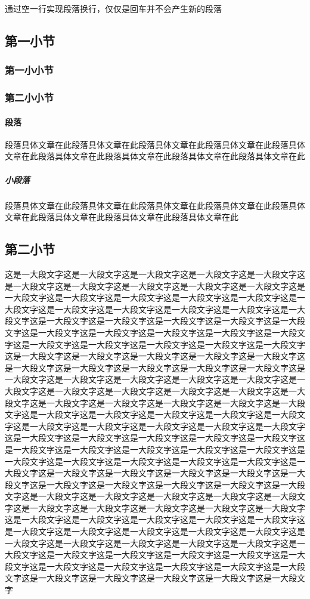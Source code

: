 \documentclass{HustGraduPaper}
\begin{document}
	通过空一行实现段落换行，仅仅是回车并不会产生新的段落
	\subsection{第一小节}
	\subsubsection{第一小小节}
	\subsubsection{第二小小节}
	\paragraph{段落}段落具体文章在此段落具体文章在此段落具体文章在此段落具体文章在此段落具体文章在此段落具体文章在此段落具体文章在此段落具体文章在此段落具体文章在此
	\subparagraph{小段落}段落具体文章在此段落具体文章在此段落具体文章在此段落具体文章在此段落具体文章在此段落具体文章在此段落具体文章在此段落具体文章在此
	\subsection{第二小节}
	这是一大段文字这是一大段文字这是一大段文字这是一大段文字这是一大段文字这是一大段文字这是一大段文字这是一大段文字这是一大段文字这是一大段文字这是一大段文字这是一大段文字这是一大段文字这是一大段文字这是一大段文字这是一大段文字这是一大段文字这是一大段文字这是一大段文字这是一大段文字这是一大段文字这是一大段文字这是一大段文字这是一大段文字这是一大段文字这是一大段文字这是一大段文字这是一大段文字这是一大段文字这是一大段文字这是一大段文字这是一大段文字这是一大段文字这是一大段文字这是一大段文字这是一大段文字这是一大段文字这是一大段文字这是一大段文字这是一大段文字这是一大段文字这是一大段文字这是一大段文字这是一大段文字这是一大段文字这是一大段文字这是一大段文字这是一大段文字这是一大段文字这是一大段文字这是一大段文字这是一大段文字这是一大段文字这是一大段文字这是一大段文字这是一大段文字这是一大段文字这是一大段文字这是一大段文字这是一大段文字这是一大段文字这是一大段文字这是一大段文字这是一大段文字这是一大段文字这是一大段文字这是一大段文字这是一大段文字这是一大段文字这是一大段文字这是一大段文字这是一大段文字这是一大段文字这是一大段文字这是一大段文字这是一大段文字这是一大段文字这是一大段文字这是一大段文字这是一大段文字这是一大段文字这是一大段文字这是一大段文字这是一大段文字这是一大段文字这是一大段文字这是一大段文字这是一大段文字这是一大段文字这是一大段文字这是一大段文字这是一大段文字这是一大段文字这是一大段文字这是一大段文字这是一大段文字这是一大段文字这是一大段文字这是一大段文字这是一大段文字这是一大段文字这是一大段文字这是一大段文字这是一大段文字这是一大段文字这是一大段文字这是一大段文字这是一大段文字这是一大段文字这是一大段文字这是一大段文字这是一大段文字这是一大段文字这是一大段文字这是一大段文字这是一大段文字这是一大段文字这是一大段文字这是一大段文字这是一大段文字这是一大段文字这是一大段文字这是一大段文字这是一大段文字这是一大段文字这是一大段文字这是一大段文字这是一大段文字这是一大段文字这是一大段文字这是一大段文字这是一大段文字这是一大段文字这是一大段文字这是一大段文字这是一大段文字这是一大段文字这是一大段文字这是一大段文字
\end{document}
